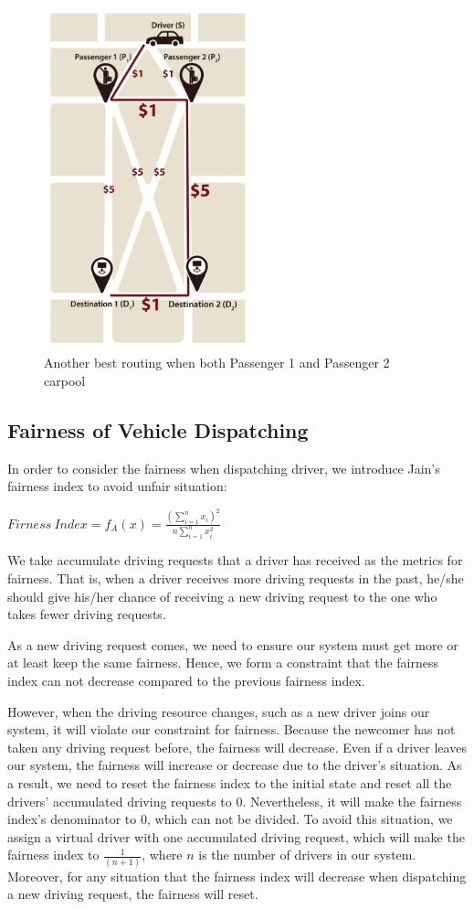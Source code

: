 \begin{figure}[htp]
  \centering
  \captionsetup{justification=centering}
  \includegraphics[width=6cm]{figures/mapV2_3.jpg}
  \caption{Another best routing when both Passenger 1 and Passenger 2 carpool}
\end{figure}
\newpage

\subsection{Fairness of Vehicle Dispatching}

In order to consider the fairness when dispatching driver, we introduce Jain's fairness index to avoid unfair situation:

$Firness\ Index = f_A(x) = \frac{\left(\sum\limits_{i=1}^{n} x_i\right)^2}{n \sum\limits_{i=1}^{n} x_i^2}$

We take accumulate driving requests that a driver has received as the metrics for fairness. That is, when a driver receives more driving requests in the past, he/she should give his/her chance of receiving a new driving request to the one who takes fewer driving requests.

As a new driving request comes, we need to ensure our system must get more or at least keep the same fairness. Hence, we form a constraint that the fairness index can not decrease compared to the previous fairness index.

However, when the driving resource changes, such as a new driver joins our system, it will violate our constraint for fairness. Because the newcomer has not taken any driving request before, the fairness will decrease. Even if a driver leaves our system, the fairness will increase or decrease due to the driver's situation. As a result, we need to reset the fairness index to the initial state and reset all the drivers' accumulated driving requests to 0. Nevertheless, it will make the fairness index's denominator to 0, which can not be divided. To avoid this situation, we assign a virtual driver with one accumulated driving request, which will make the fairness index to $\frac{1}{(n+1)}$, where $n$ is the number of drivers in our system. Moreover, for any situation that the fairness index will decrease when dispatching a new driving request, the fairness will reset.

